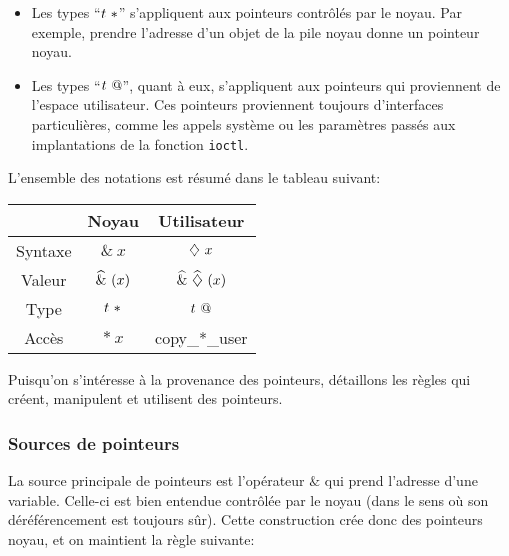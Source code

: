 \begin{itemize}

\item Les types \enquote{$\ptrK{t}$} s'appliquent aux pointeurs contrôlés par le
noyau. Par exemple, prendre l'adresse d'un objet de la pile noyau donne un
pointeur noyau.

\item Les types \enquote{$\ptrU{t}$}, quant à eux, s'appliquent aux pointeurs
qui proviennent de l'espace utilisateur. Ces pointeurs proviennent toujours
d'interfaces particulières, comme les appels système ou les paramètres
passés aux implantations de la fonction \texttt{ioctl}.

\end{itemize}

L'ensemble des notations est résumé dans le tableau suivant:

\begin{center}
\begin{tabular}{ccc}
\toprule
        & Noyau        & Utilisateur \\
\midrule
Syntaxe & $\&~x$       & $\eTaint{x}$ \\
Valeur  & $\wphi{(x)}$ & $\wphi{\vTainted{(x)}}$ \\
Type    & $\ptrK{t}$   & $\ptrU{t}$ \\
Accès   & $*~x$        & copy\_*\_user \\
\bottomrule
\end{tabular}
\end{center}

Puisqu'on s'intéresse à la provenance des pointeurs, détaillons les règles qui
créent, manipulent et utilisent des pointeurs.

\subsubsection*{Sources de pointeurs}

La source principale de pointeurs est l'opérateur $\&$ qui prend l'adresse d'une
variable. Celle-ci est bien entendue contrôlée par le noyau (dans le sens où son
déréférencement est toujours sûr). Cette construction crée donc des pointeurs
noyau, et on maintient la règle suivante:


\begin{mathpar}
\end{mathpar}


